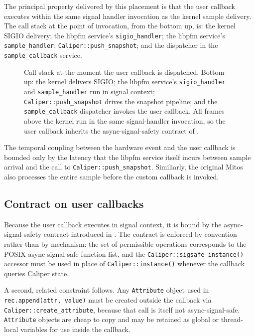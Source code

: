The principal property delivered by this placement is that the user callback executes within the same signal handler invocation as the kernel sample delivery. The call stack at the point of invocation, from the bottom up, is: the kernel SIGIO delivery; the libpfm service's \texttt{sigio\_handler}; the libpfm service's \texttt{sample\_handler}; \texttt{Caliper::push\_snapshot}; and the dispatcher in the \texttt{sample\_callback} service. \begin{figure}[h]
    \centering
    
    \caption[Call stack on user-callback dispatch.]{Call stack at the moment the user callback is dispatched. Bottom-up: the kernel delivers SIGIO; the libpfm service's \texttt{sigio\_handler} and \texttt{sample\_handler} run in signal context; \texttt{Caliper::push\_snapshot} drives the snapshot pipeline; and the \texttt{sample\_callback} dispatcher invokes the user callback. All frames above the kernel run in the same signal-handler invocation, so the user callback inherits the async-signal-safety contract of .}
    \label{fig:callstack}
\end{figure} The temporal coupling between the hardware event and the user callback is bounded only by the latency that the libpfm service itself incurs between sample arrival and the call to \texttt{Caliper::push\_snapshot}. Similiarly, the original Mitos also processes the entire sample before the custom callback is invoked. 

\subsection{Contract on user callbacks}\label{subsec:sample-callback-contract}

Because the user callback executes in signal context, it is bound by the async-signal-safety contract introduced in . The contract is enforced by convention rather than by mechanism: the set of permissible operations corresponds to the POSIX async-signal-safe function list\cite{sigsafetyManpage}, and the \texttt{Caliper::sigsafe\_instance()} accessor must be used in place of \texttt{Caliper::instance()} whenever the callback queries Caliper state.

A second, related constraint follows. Any \texttt{Attribute} object used in \texttt{rec.append(attr, value)} must be created outside the callback via \texttt{Caliper::create\_attribute}, because that call is itself not async-signal-safe. \texttt{Attribute} objects are cheap to copy and may be retained as global or thread-local variables for use inside the callback.

